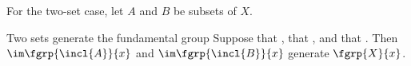 For the two-set case, let $A$ and $B$ be subsets of $X$.

\begin{corollary}[id=4.2]{Two sets generate the fundamental group}
Suppose that \hypCoverTwo, that \hypPathConnected, and that \hypBasepoint.
Then $\im \fgrp{\incl{A}}{x}$ and $\im \fgrp{\incl{B}}{x}$ generate
$\fgrp{X}{x}$.
\end{corollary}
